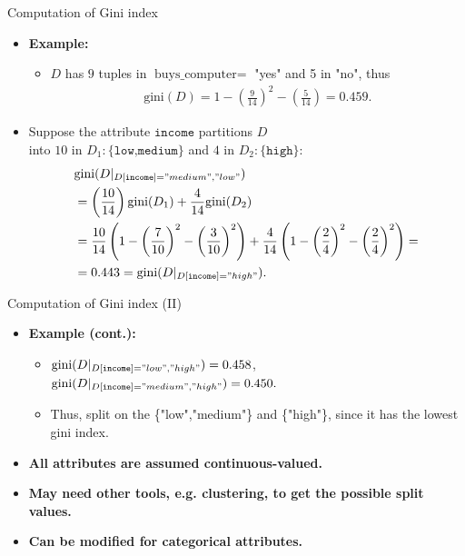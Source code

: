 \documentclass[aspectratio=169,t,table]{beamer}
\begin{document}
  {
    \begin{frame}{Computation of Gini index}
      \begin{itemize}
        \item \textbf{Example:}
        \begin{itemize}
          \item $D$ has $9$ tuples in $\text{buys\_computer} =$ "yes" and 5 in "no", thus
          \begin{align}
            \text{gini}(D) = 1 - \left( \frac{9}{14} \right)^2 - \left( \frac{5}{14} \right) = 0.459.
          \end{align}
        \end{itemize}
        \item Suppose the attribute $\texttt{income}$ partitions $D$ \\ into $10$ in $D_1:\{\texttt{low,medium}\}$ and $4$ in $D_2: \{\texttt{high}\}$:
        \begin{align}
          &\text{gini}(D\vert_{D[\texttt{income}]="medium", "low"}) \\
          &= \left( \frac{10}{14} \right) \text{gini}(D_1) + \frac{4}{14} \text{gini}(D_2)\\
          &=\frac{10}{14} \left(1-\left( \frac{7}{10} \right)^2 - \left( \frac{3}{10} \right)^2 \right) + \frac{4}{14} \left( 1-\left( \frac{2}{4} \right)^2 - \left( \frac{2}{4} \right)^2 \right) =\\
          &= 0.443 = \text{gini}(D\vert_{D[\texttt{income}]="high"}).
        \end{align}
      \end{itemize}
    \end{frame}
  }

  {
    \begin{frame}{Computation of Gini index (II)}
      \begin{itemize}
        \item \textbf{Example (cont.):}
        \begin{itemize}
          \item $\text{gini}(D\vert_{D[\texttt{income}]="low", "high"}) = 0.458$,\\
                $\text{gini}(D\vert_{D[\texttt{income}]="medium", "high"}) = 0.450.$
          \item Thus, split on the \{"low","medium"\} and \{"high"\}, since it has the lowest gini index.
        \end{itemize}
        \item \textbf{All attributes are assumed continuous-valued.}
        \item \textbf{May need other tools, e.g. clustering, to get the possible split values.}
        \item \textbf{Can be modified for categorical attributes.}
      \end{itemize}
    \end{frame}
  }
\end{document}
